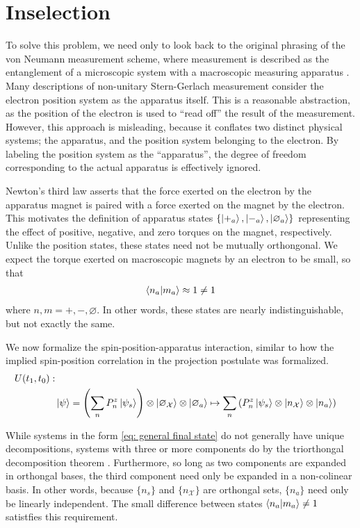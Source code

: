 \section{Inselection}

To solve this problem, we need only to look back to the original phrasing of the von Neumann measurement scheme, where measurement is described as the entanglement of a microscopic system with a macroscopic measuring apparatus \cite{Neumann}. Many descriptions of non-unitary Stern-Gerlach measurement consider the electron position system as the apparatus itself. This is a reasonable abstraction, as the position of the electron is used to ``read off'' the result of the measurement. However, this approach is misleading, because it conflates two distinct physical systems; the apparatus, and the position system belonging to the electron. By labeling the position system as the ``apparatus'', the degree of freedom corresponding to the actual apparatus is effectively ignored.

Newton's third law asserts that the force exerted on the electron by the apparatus magnet is paired with a force exerted on the magnet by the electron. This motivates the definition of apparatus states $\{\ket{+_a}, \ket{-_a}, \ket{\varnothing_a}\}$ representing the effect of positive, negative, and zero torques on the magnet, respectively. Unlike the position states, these states need not be mutually orthongonal. We expect the torque exerted on macroscopic magnets by an electron to be small, so that
\begin{align}
  \braket{n_a | m_a} \approx 1 \neq 1
\end{align}
where $n, m = +, -, \varnothing$. In other words, these states are nearly indistinguishable, but not exactly the same.

We now formalize the spin-position-apparatus interaction, similar to how the implied spin-position correlation in the projection postulate was formalized.
\begin{align} \label{eq: unitary operator inselection}
    \nonumber U(t_1, t_0): \\
    & \ket{\psi} = \left(\sum_{n} P^z_n\ket{\psi_s}\right) \otimes \ket{\varnothing_\mathcal{X}} \otimes \ket{\varnothing_a} \mapsto \sum_{n}\left(P^z_n\ket{\psi_s} \otimes \ket{n_\mathcal{X}} \otimes \ket{n_a} \right)
\end{align}

While systems in the form \autoref{eq: general final state} do not generally have unique decompositions, systems with three or more components do by the triorthongal decomposition theorem \cite{Elby}. Furthermore, so long as two components are expanded in orthongal bases, the third component need only be expanded in a non-colinear basis. In other words, because $\{n_s\}$ and $\{n_\mathcal{X}\}$ are orthongal sets, $\{n_a\}$ need only be linearly independent. The small difference between states $\braket{n_a | m_a} \neq 1$ satistfies this requirement.

